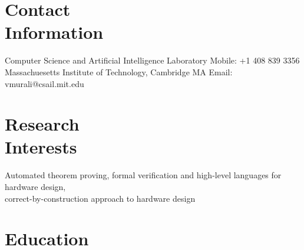 \documentclass[margin,line]{resume}
\begin{document}
\begin{resume}

    \section{\mysidestyle Contact\\Information}

    Computer Science and Artificial Intelligence Laboratory   \hfill Mobile: +1 408 839 3356          \\
    Massachuesetts Institute of Technology, Cambridge MA     \hfill Email: vmurali@csail.mit.edu    \\

    \vspace{-7mm}
    \section{\mysidestyle Research\\Interests}

    Automated theorem proving, formal verification and high-level languages for hardware design,\\
    correct-by-construction approach to hardware design

    \vspace{-3mm}
    \section{\mysidestyle Education}


\end{resume}
\end{document}
